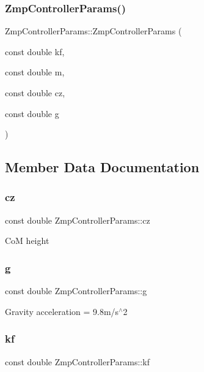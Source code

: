 \subsubsection{\texorpdfstring{Zmp\+Controller\+Params()}{ZmpControllerParams()}}
{\footnotesize\ttfamily Zmp\+Controller\+Params\+::\+Zmp\+Controller\+Params (\begin{DoxyParamCaption}\item[{const double}]{kf,  }\item[{const double}]{m,  }\item[{const double}]{cz,  }\item[{const double}]{g }\end{DoxyParamCaption})\hspace{0.3cm}{\ttfamily [inline]}}



\subsection{Member Data Documentation}
\hypertarget{structZmpControllerParams_ae0d24b7bdae3eb228b9db827934d0e87}{}\label{structZmpControllerParams_ae0d24b7bdae3eb228b9db827934d0e87} 
\subsubsection{\texorpdfstring{cz}{cz}}
{\footnotesize\ttfamily const double Zmp\+Controller\+Params\+::cz}

CoM height \hypertarget{structZmpControllerParams_af97a6bcc6b60e8372dd444d695d705f7}{}\label{structZmpControllerParams_af97a6bcc6b60e8372dd444d695d705f7} 
\subsubsection{\texorpdfstring{g}{g}}
{\footnotesize\ttfamily const double Zmp\+Controller\+Params\+::g}

Gravity acceleration = 9.\+8m/s$^\wedge$2 \hypertarget{structZmpControllerParams_a6138cbf819799519abd3864bd8bf05cf}{}\label{structZmpControllerParams_a6138cbf819799519abd3864bd8bf05cf} 
\subsubsection{\texorpdfstring{kf}{kf}}
{\footnotesize\ttfamily const double Zmp\+Controller\+Params\+::kf}

